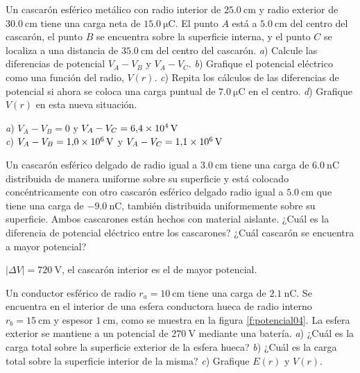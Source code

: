 %
\begin{Exercise}
  Un cascarón esférico metálico con radio interior de $\SI{25.0}{\centi\metre}$ y radio exterior de $\SI{30.0}{\centi\metre}$ tiene una carga neta de $\SI{15.0}{\micro\coulomb}$. El punto $A$ está a $\SI{5.0}{\centi\metre}$ del centro del cascarón, el punto $B$ se encuentra sobre la superficie interna, y el punto $C$ se localiza a una distancia de $\SI{35.0}{\centi\metre}$ del centro del cascarón. \textit{a}) Calcule las diferencias de potencial $V_A-V_B$ y $V_A-V_C$. \textit{b}) Grafique el potencial eléctrico como una función del radio, $V(r)$. \textit{c}) Repita los cálculos de las diferencias de potencial si ahora se coloca una carga puntual de $\SI{7.0}{\micro\coulomb}$ en el centro. \textit{d}) Grafique $V(r)$ en esta nueva situación.
\end{Exercise}
\begin{Answer}
	\begin{minipage}[t]{.4\textwidth}
    \textit{a}) $V_A-V_B = 0$ y $V_A-V_C = \SI{6.4E4}{\volt}$\\ \textit{c}) $V_A-V_B = \SI{1.0E6}{\volt}$ y $V_A-V_C = \SI{1.1E6}{\volt}$
  \end{minipage}
\end{Answer}
%
\begin{Exercise}
  Un cascarón esférico delgado de radio igual a $\SI{3.0}{\centi\metre}$ tiene una carga de $\SI{6.0}{\nano\coulomb}$ distribuida de manera uniforme sobre su superficie y está colocado concéntricamente con otro cascarón esférico delgado radio igual a $\SI{5.0}{\centi\metre}$ que tiene una carga de $\SI{-9.0}{\nano\coulomb}$, también distribuida uniformemente sobre su superficie. Ambos cascarones están hechos con material aislante. ¿Cuál es la diferencia de potencial eléctrico entre los cascarones? ¿Cuál cascarón se encuentra a mayor potencial?
\end{Exercise}
\begin{Answer}
	\begin{minipage}[t]{.4\textwidth}
    $|\Delta V| = \SI{720}{\volt}$, el cascarón interior es el de mayor potencial.
  \end{minipage}
\end{Answer}
%
\begin{Exercise}\label{p:potencial04}
  Un conductor esférico de radio $r_a = \SI{10}{\centi\metre}$ tiene una carga de $\SI{2.1}{\nano\coulomb}$. Se encuentra en el interior de una esfera conductora hueca de radio interno $r_b = \SI{15}{\centi\metre}$ y espesor $\SI{1}{\centi\metre}$, como se muestra en la figura \ref{f:potencial04}. La esfera exterior se mantiene a un potencial de $\SI{270}{\volt}$ mediante una batería. \textit{a}) ¿Cuál es la carga total sobre la superficie exterior de la esfera hueca? \textit{b}) ¿Cuál es la carga total sobre la superficie interior de la misma? \textit{c}) Grafique $E(r)$ y $V(r)$.
\end{Exercise}
